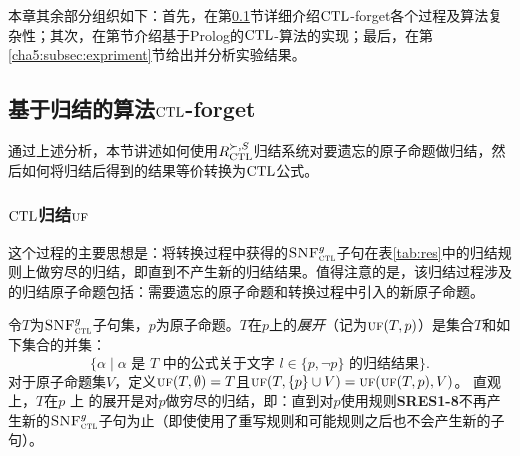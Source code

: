 
本章其余部分组织如下：首先，在第\ref{cha5:subsec:resf}节详细介绍$\textrm{CTL}$-forget各个过程及算法复杂性；其次，在第\label{cha5:subsec:prolog}节介绍基于Prolog的$\textrm{CTL}$-算法的实现；最后，在第\ref{cha5:subsec:expriment}节给出并分析实验结果。
\subsection{基于归结的算法$\textrm{CTL}$-forget}
\label{cha5:subsec:resf}
通过上述分析，本节讲述如何使用$R_{\textrm{CTL}}^{\succ,S}$归结系统对要遗忘的原子命题做归结，然后如何将归结后得到的结果等价转换为$\textrm{CTL}$公式。
\subsubsection{$\textrm{CTL}$归结$\textsc{uf}$}

这个过程的主要思想是：将转换过程中获得的${\textsc{SNF}_{\textsc{ctl}}^g}$子句在表\ref{tab:res}中的归结规则上做穷尽的归结，即直到不产生新的归结结果。值得注意的是，该归结过程涉及的归结原子命题包括：需要遗忘的原子命题和转换过程中引入的新原子命题。

令$T$为${\textsc{SNF}_{\textsc{ctl}}^g}$子句集，$p$为原子命题。$T$在$p$上的\emph{展开}（记为$\textsc{uf}(T,p)$）是集合$T$和如下集合的并集：
\[\{\alpha\mid \mbox{$\alpha$ 是 $T$ 中的公式关于文字 $l\in\{p,\neg p\}$ 的归结结果}\}.  \]
对于原子命题集$V$，定义$\textsc{uf}(T,\emptyset)=T$且$\textsc{uf}(T,\{p\}\cup V)=\textsc{uf}(\textsc{uf}(T,p), V)$。
直观上，$T$在$p$ 上 的展开是对$p$做穷尽的归结，即：直到对$p$使用规则{\bf SRES1-8}不再产生新的${\textsc{SNF}_{\textsc{ctl}}^g}$子句为止（即使使用了重写规则和可能规则之后也不会产生新的子句）。


